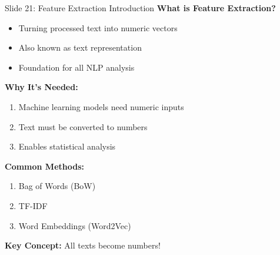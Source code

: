 \documentclass[8pt]{beamer}
\begin{document}
	\begin{frame}{Slide 21: Feature Extraction Introduction}
		\fontsize{6.5}{7.5}\selectfont
		\textbf{What is Feature Extraction?}
		\begin{itemize}
			\item Turning processed text into numeric vectors
			\item Also known as text representation
			\item Foundation for all NLP analysis
		\end{itemize}
		
		\vspace{0.1cm}
		\textbf{Why It's Needed:}
		\begin{enumerate}
			\item Machine learning models need numeric inputs
			\item Text must be converted to numbers
			\item Enables statistical analysis
		\end{enumerate}
		
		\vspace{0.1cm}
		\textbf{Common Methods:}
		\begin{enumerate}
			\item Bag of Words (BoW)
			\item TF-IDF
			\item Word Embeddings (Word2Vec)
		\end{enumerate}
		
		\textcolor{myblue}{\textbf{Key Concept:}} All texts become numbers!
	\end{frame}
	
\end{document}
